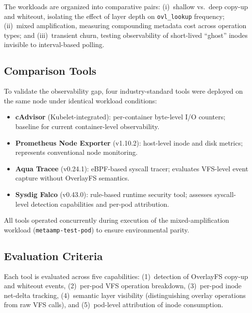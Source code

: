 \documentclass[conference]{IEEEtran}
\begin{document}
The workloads are organized into comparative pairs: (i)~shallow vs.\ deep copy-up and whiteout, isolating the effect of layer depth on \texttt{ovl\_lookup} frequency; (ii)~mixed amplification, measuring compounding metadata cost across operation types; and (iii)~transient churn, testing observability of short-lived ``ghost'' inodes invisible to interval-based polling.

\subsection{Comparison Tools}
\label{subsec:comparison}

To validate the observability gap, four industry-standard tools were deployed on the same node under identical workload conditions:

\begin{itemize}
    \item \textbf{cAdvisor} (Kubelet-integrated): per-container byte-level I/O counters; baseline for current container-level observability.
    \item \textbf{Prometheus Node Exporter} (v1.10.2): host-level inode and disk metrics; represents conventional node monitoring.
    \item \textbf{Aqua Tracee} (v0.24.1): eBPF-based syscall tracer; evaluates VFS-level event capture without OverlayFS semantics.
    \item \textbf{Sysdig Falco} (v0.43.0): rule-based runtime security tool; assesses syscall-level detection capabilities and per-pod attribution.
\end{itemize}

All tools operated concurrently during execution of the mixed-amplification workload (\texttt{metaamp-test-pod}) to ensure environmental parity.

\subsection{Evaluation Criteria}
\label{subsec:criteria}

Each tool is evaluated across five capabilities: (1)~detection of OverlayFS copy-up and whiteout events, (2)~per-pod VFS operation breakdown, (3)~per-pod inode net-delta tracking, (4)~semantic layer visibility (distinguishing overlay operations from raw VFS calls), and (5)~pod-level attribution of inode consumption.

\end{document}
